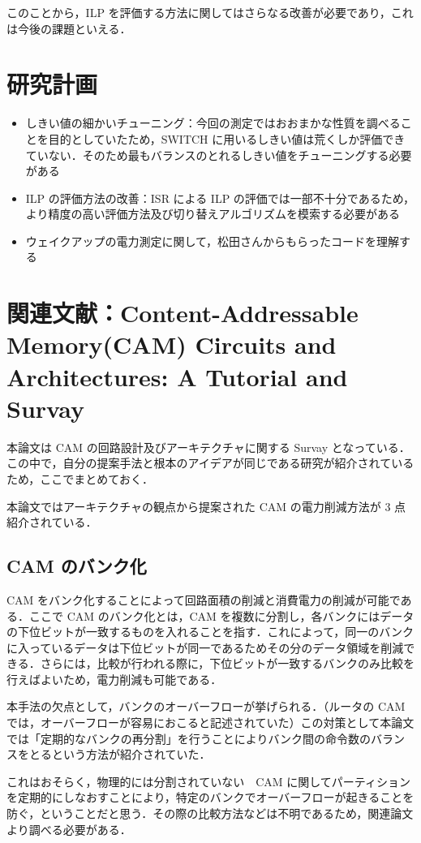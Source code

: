 \documentclass[twocolumn]{jsarticle}
\begin{document}
  このことから，ILP を評価する方法に関してはさらなる改善が必要であり，これは今後の課題といえる．

  \section{研究計画}
  
  \begin{itemize}
    \item しきい値の細かいチューニング：今回の測定ではおおまかな性質を調べることを目的としていたため，SWITCH に用いるしきい値は荒くしか評価できていない．そのため最もバランスのとれるしきい値をチューニングする必要がある
    \item ILP の評価方法の改善：ISR による ILP の評価では一部不十分であるため，より精度の高い評価方法及び切り替えアルゴリズムを模索する必要がある
    \item ウェイクアップの電力測定に関して，松田さんからもらったコードを理解する
  \end{itemize}
  
  \section{関連文献：Content-Addressable Memory(CAM) Circuits and Architectures: A Tutorial and Survay\cite{CAM-survay}}
  本論文は CAM の回路設計及びアーキテクチャに関する Survay となっている．この中で，自分の提案手法と根本のアイデアが同じである研究が紹介されているため，ここでまとめておく．

  本論文ではアーキテクチャの観点から提案された CAM の電力削減方法が 3 点紹介されている．
  \subsection{CAM のバンク化}
  CAM をバンク化することによって回路面積の削減と消費電力の削減が可能である．ここで CAM のバンク化とは，CAM を複数に分割し，各バンクにはデータの下位ビットが一致するものを入れることを指す．これによって，同一のバンクに入っているデータは下位ビットが同一であるためその分のデータ領域を削減できる．さらには，比較が行われる際に，下位ビットが一致するバンクのみ比較を行えばよいため，電力削減も可能である．

  本手法の欠点として，バンクのオーバーフローが挙げられる．（ルータの CAM では，オーバーフローが容易におこると記述されていた）この対策として本論文では「定期的なバンクの再分割」を行うことによりバンク間の命令数のバランスをとるという方法が紹介されていた．

  これはおそらく，物理的には分割されていない　CAM に関してパーティションを定期的にしなおすことにより，特定のバンクでオーバーフローが起きることを防ぐ，ということだと思う．その際の比較方法などは不明であるため，関連論文より調べる必要がある．
\end{document}

